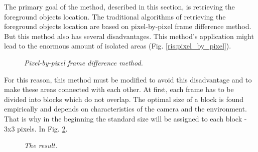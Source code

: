 \documentclass[12pt,a4paper,oneside,titlepage]{article}
\begin{document}
The primary goal of the method, described in this section, is retrieving the foreground objects location.
The traditional algorithms of retrieving the foreground objects location are based on pixel-by-pixel frame difference method.
But this method also has several disadvantages.
This method's application might lead to the enormous amount of isolated areas (Fig. \ref{ris:pixel_by_pixel}).

\begin{figure}[h]
  \vspace{-5ex}
  \caption{\textit{Pixel-by-pixel frame difference method.}}
  \label{fig:pixel_by_pixel}
\end{figure}

For this reason, this method must be modified to avoid this disadvantage and to make these areas connected with each other.
At first, each frame has to be divided into blocks which do not overlap.
The optimal size of a block is found empirically and depends on characteristics of the camera and the environment.
That is why in the beginning the standard size will be assigned to each block - 3x3 pixels.
In Fig. \ref{fig:fig2}.

\begin{figure}[h]
  \vspace{-5ex}
  \caption{\textit{The result.}}
  \label{fig:fig2}
\end{figure}
\end{document}
